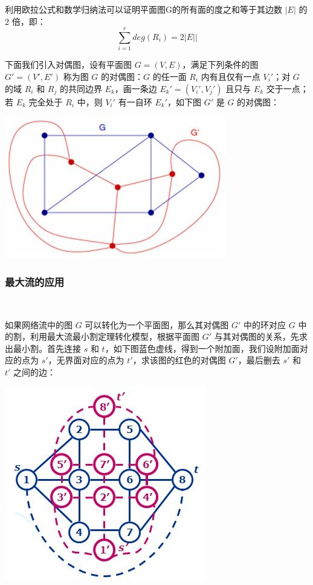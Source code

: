 	利用欧拉公式和数学归纳法可以证明平面图G的所有面的度之和等于其边数 $\left|E\right|$ 的 $2$ 倍，即：
	$$
	\sum_{i=1}^{r}deg(R_i)=2\left|E|\right|
	$$
	
	下面我们引入对偶图，设有平面图 $G=(V,E)$，满足下列条件的图$G'=(V',E')$ 称为图 $G$ 的对偶图：$G$ 的任一面 $R_i$ 内有且仅有一点 $V_i'$；对 $G$ 的域 $R_i$ 和 $R_j$ 的共同边界 $E_k$，画一条边 $E_k'=(V_i',V_j')$ 且只与 $E_k$ 交于一点；若 $E_k$ 完全处于 $R_i$ 中，则 $V_i'$ 有一自环 $E_k'$，如下图 $G'$ 是 $G$ 的对偶图：
	\begin{center}
		\includegraphics[scale=0.5]{./source/img3.jpeg}
	\end{center}
	\subsubsection{最大流的应用}~
	
	如果网络流中的图 $G$ 可以转化为一个平面图，那么其对偶图 $G'$ 中的环对应 $G$ 中的割，利用最大流最小割定理转化模型，根据平面图 $G'$ 与其对偶图的关系，先求出最小割。首先连接 $s$ 和 $t$，如下图蓝色虚线，得到一个附加面，我们设附加面对应的点为 $s'$，无界面对应的点为 $t'$，求该图的红色的对偶图 $G'$，最后删去 $s'$ 和 $t'$ 之间的边：
	\begin{center}
		\includegraphics[scale=0.5]{./source/img4.jpeg}
	\end{center}
	
